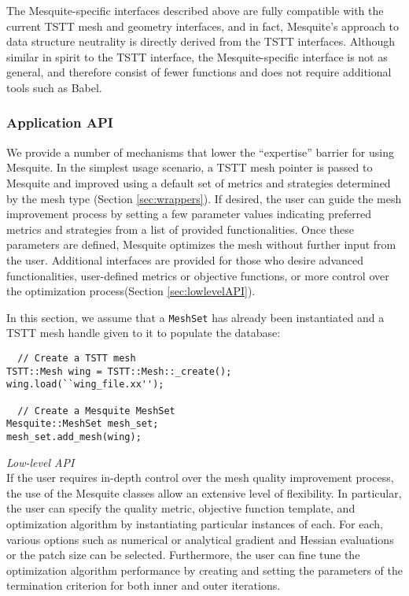 \documentclass[psfig]{article}
\begin{document}
The Mesquite-specific interfaces described above are fully compatible
with the current TSTT mesh and geometry interfaces, and in fact,
Mesquite's approach to data structure neutrality is directly derived
from the TSTT interfaces.  Although similar in spirit to the TSTT
interface, the Mesquite-specific interface is not as general, and 
therefore consist of fewer
functions and does not require additional tools such as Babel.

\subsubsection{Application API}

We provide a number of mechanisms that lower the ``expertise'' barrier
for using Mesquite.  In the simplest usage scenario, a TSTT mesh
pointer is passed to Mesquite and improved using a default set of
metrics and strategies determined by the mesh type (Section
\ref{sec:wrappers}).  If desired, the user can guide the mesh
improvement process by setting a few parameter values indicating
preferred metrics and strategies from a list of provided
functionalities.  Once these parameters are defined, Mesquite
optimizes the mesh without further input from the user.  Additional
interfaces are provided for those who desire advanced functionalities,
user-defined metrics or objective functions, or more control over the
optimization process(Section \ref{sec:lowlevelAPI}).

In this section, we 
assume that a \texttt{MeshSet} has already been instantiated 
and a TSTT mesh handle given to it to populate the database:
\begin{verbatim}
  // Create a TSTT mesh
TSTT::Mesh wing = TSTT::Mesh::_create();
wing.load(``wing_file.xx'');

  // Create a Mesquite MeshSet
Mesquite::MeshSet mesh_set;
mesh_set.add_mesh(wing);
\end{verbatim}

{\it Low-level API} \\

If the user requires in-depth control over the mesh quality improvement
process, the use of the Mesquite classes allow an extensive
level of flexibility.   In particular, the user can specify the quality
metric, objective function template, and optimization algorithm by
instantiating particular instances of each.  For each, various options
such as numerical or analytical gradient and Hessian evaluations or
the patch size can be selected.  Furthermore, the user can fine tune
the optimization algorithm performance by creating and setting the parameters 
of the termination criterion for both inner and outer iterations.
\end{document}
